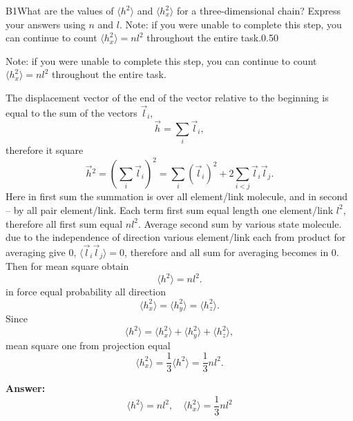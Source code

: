 \documentclass[11pt,a4paper]{article}
\begin{document}
\begin{solcard}{B1}{What are the values of $\langle h^2\rangle $ and $\langle h_x^2\rangle $ for a three-dimensional chain? Express your answers using $n$ and $l$. Note: if you were unable to complete this step, you can continue to count $\langle h_x^2\rangle = nl^2$ throughout the entire task.}{0.50}

Note: if you were unable to complete this step, you can continue to count $\langle h_x^2\rangle = nl^2$ throughout the entire task.


The displacement vector of the end of the vector relative to the beginning is equal to the sum of the vectors $\vec{l}_i$, $$ \vec{h} = \sum_i \vec{l}_i, $$therefore it square $$ \vec{h}{}^2 = \left( \sum_i \vec{l}_i \right)^2 = \sum_i (\vec{l}_i)^2 +2 \sum_{i < j} \vec{l}_i {\vec{l}_j}. $$Here in first sum the summation is over all element/link molecule, and in second – by all pair element/link. Each term first sum equal length one element/link $l^2$, therefore all first sum equal $n l^2$. Average second sum by various state molecule. due to the independence of direction various element/link each from product for averaging give 0, $\langle \vec{l}_i \vec{l}_j \rangle = 0$, therefore and all sum for averaging becomes in 0. Then for mean square obtain $$ \langle h^2 \rangle = n l^2. $$in force equal probability all direction $$ \langle h_x^2 \rangle = \langle h_y^2 \rangle =\langle h_z^2 \rangle. $$Since $$ \langle h^2 \rangle = \langle h_x^2 \rangle + \langle h_y^2 \rangle+ \langle h_z^2 \rangle, $$mean square one from projection equal $$ \langle h_x^2 \rangle = \frac{1}{3} \langle h^2 \rangle = \frac{1}{3} n l^2. $$

\par\smallskip\noindent\textbf{Answer:} $$ \langle h^2 \rangle = n l^2 ,\quad \langle h_x^2 \rangle = \frac{1}{3} nl^2 $$
\end{solcard}
\end{document}
